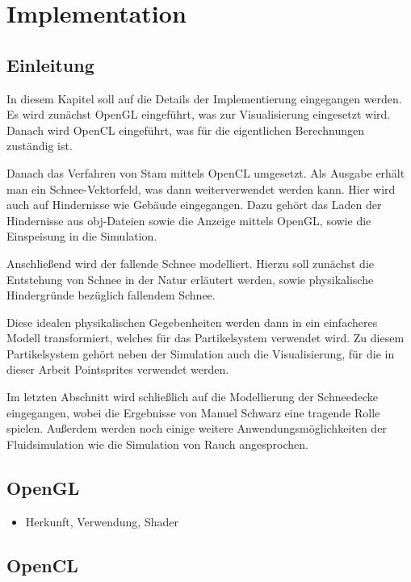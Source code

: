 \section{Implementation}

\subsection{Einleitung}

In diesem Kapitel soll auf die Details der Implementierung eingegangen werden. Es
wird zunächst OpenGL eingeführt, was zur Visualisierung eingesetzt wird. Danach
wird OpenCL eingeführt, was für die eigentlichen Berechnungen zuständig ist.

Danach das Verfahren von Stam mittels OpenCL umgesetzt. Als Ausgabe erhält man
ein Schnee-Vektorfeld, was dann weiterverwendet werden kann. Hier wird auch auf
Hindernisse wie Gebäude eingegangen. Dazu gehört das Laden der Hindernisse aus
obj-Dateien sowie die Anzeige mittels OpenGL, sowie die Einspeisung in die
Simulation.

Anschließend wird der fallende Schnee modelliert. Hierzu soll zunächst die
Entstehung von Schnee in der Natur erläutert werden, sowie physikalische
Hindergründe bezüglich fallendem Schnee.

Diese idealen physikalischen Gegebenheiten werden dann in ein einfacheres
Modell transformiert, welches für das Partikelsystem verwendet wird. Zu diesem
Partikelsystem gehört neben der Simulation auch die Visualisierung, für die in
dieser Arbeit Pointsprites verwendet werden.

Im letzten Abschnitt wird schließlich auf die Modellierung der Schneedecke
eingegangen, wobei die Ergebnisse von Manuel Schwarz \cite{Schwarz2012} eine
tragende Rolle spielen. Außerdem werden noch einige weitere
Anwendungsmöglichkeiten der Fluidsimulation wie die Simulation von Rauch
angesprochen.

\subsection{OpenGL}

\begin{itemize}
\item Herkunft, Verwendung, Shader
\end{itemize}

\subsection{OpenCL}

